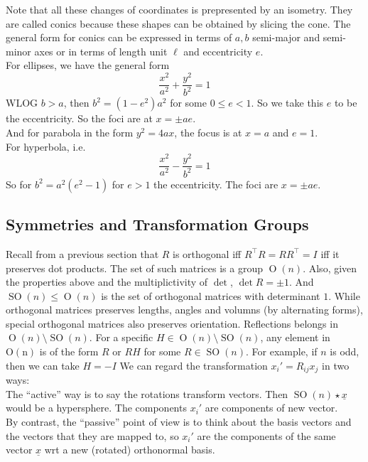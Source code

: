 Note that all these changes of coordinates is prepresented by an isometry.
They are called conics because these shapes can be obtained by slicing the cone.
The general form for conics can be expressed in terms of $a,b$ semi-major and semi-minor axes or in terms of length unit $\ell$ and eccentricity $e$.\\
For ellipses, we have the general form
$$\frac{x^2}{a^2}+\frac{y^2}{b^2}=1$$
WLOG $b>a$, then $b^2=(1-e^2)a^2$ for some $0\le e<1$.
So we take this $e$ to be the eccentricity.
So the foci are at $x=\pm ae$.\\
And for parabola in the form $y^2=4ax$, the focus is at $x=a$ and $e=1$.\\
For hyperbola, i.e.
$$\frac{x^2}{a^2}-\frac{y^2}{b^2}=1$$
So for $b^2=a^2(e^2-1)$ for $e>1$ the eccentricity.
The foci are $x=\pm ae$.
\subsection{Symmetries and Transformation Groups}
Recall from a previous section that $R$ is orthogonal iff $R^\top R=RR^\top=I$ iff it preserves dot products.
The set of such matrices is a group $\operatorname{O}(n)$.
Also, given the properties above and the multiplictivity of $\det$, $\det R=\pm 1$.
And $\operatorname{SO}(n)\le \operatorname{O}(n)$ is the set of orthogonal matrices with determinant $1$.
While orthogonal matrices preserves lengths, angles and volumns (by alternating forms), special orthogonal matrices also preserves orientation.
Reflections belongs in $\operatorname{O}(n)\setminus\operatorname{SO}(n)$.
For a specific $H\in \operatorname{O}(n)\setminus\operatorname{SO}(n)$, any element in $\operatorname{O(n)}$ is of the form $R$ or $RH$ for some $R\in\operatorname{SO}(n)$.
For example, if $n$ is odd, then we can take $H=-I$
We can regard the transformation $x_i'=R_{ij}x_j$ in two ways:\\
The ``active'' way is to say the rotations transform vectors.
Then $\operatorname{SO}(n)\star\underline{x}$ would be a hypersphere.
The components $x_i'$ are components of new vector.\\
By contrast, the ``passive'' point of view is to think about the basis vectors and the vectors that they are mapped to, so $x_i'$ are the components of the same vector $\underline{x}$ wrt a new (rotated) orthonormal basis.
